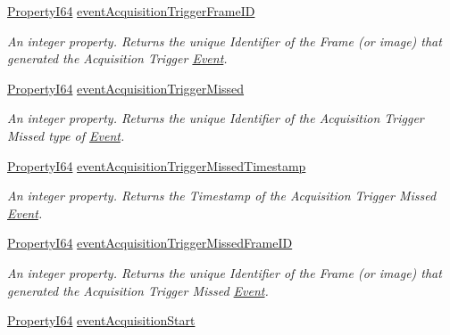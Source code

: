 \begin{DoxyCompactItemize}
\hyperlink{group___common_interface_ga81749b2696755513663492664a18a893}{Property\+I64} \hyperlink{classmv_i_m_p_a_c_t_1_1acquire_1_1_gen_i_cam_1_1_event_control_ac15fd6737465a020f94c8177638757a3}{event\+Acquisition\+Trigger\+Frame\+I\+D}
\begin{DoxyCompactList}\small\item\em An integer property. Returns the unique Identifier of the Frame (or image) that generated the Acquisition Trigger \hyperlink{classmv_i_m_p_a_c_t_1_1acquire_1_1_event}{Event}. \end{DoxyCompactList}\item 
\hyperlink{group___common_interface_ga81749b2696755513663492664a18a893}{Property\+I64} \hyperlink{classmv_i_m_p_a_c_t_1_1acquire_1_1_gen_i_cam_1_1_event_control_a7cab64b7a83db5cac54a578c023b15f5}{event\+Acquisition\+Trigger\+Missed}
\begin{DoxyCompactList}\small\item\em An integer property. Returns the unique Identifier of the Acquisition Trigger Missed type of \hyperlink{classmv_i_m_p_a_c_t_1_1acquire_1_1_event}{Event}. \end{DoxyCompactList}\item 
\hyperlink{group___common_interface_ga81749b2696755513663492664a18a893}{Property\+I64} \hyperlink{classmv_i_m_p_a_c_t_1_1acquire_1_1_gen_i_cam_1_1_event_control_ada1bb3e40d2a409b3fe5cef941298c2b}{event\+Acquisition\+Trigger\+Missed\+Timestamp}
\begin{DoxyCompactList}\small\item\em An integer property. Returns the Timestamp of the Acquisition Trigger Missed \hyperlink{classmv_i_m_p_a_c_t_1_1acquire_1_1_event}{Event}. \end{DoxyCompactList}\item 
\hyperlink{group___common_interface_ga81749b2696755513663492664a18a893}{Property\+I64} \hyperlink{classmv_i_m_p_a_c_t_1_1acquire_1_1_gen_i_cam_1_1_event_control_aa87fa6de6e372f2a7c388fffb91f3dda}{event\+Acquisition\+Trigger\+Missed\+Frame\+I\+D}
\begin{DoxyCompactList}\small\item\em An integer property. Returns the unique Identifier of the Frame (or image) that generated the Acquisition Trigger Missed \hyperlink{classmv_i_m_p_a_c_t_1_1acquire_1_1_event}{Event}. \end{DoxyCompactList}\item 
\hyperlink{group___common_interface_ga81749b2696755513663492664a18a893}{Property\+I64} \hyperlink{classmv_i_m_p_a_c_t_1_1acquire_1_1_gen_i_cam_1_1_event_control_ad67f2921877e5a5c8256f7bf451e71ee}{event\+Acquisition\+Start}

\end{DoxyCompactItemize}
